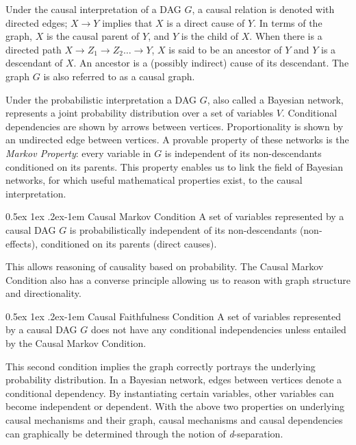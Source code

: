 \documentclass[a4paper, english]{article}
\makeatletter
\renewcommand{\paragraph}{%
  \@startsection{paragraph}{4}%
  {\z@}{0.5ex \@plus 1ex \@minus .2ex}{-1em}%
  {\normalfont\normalsize\bfseries}%
}
\makeatother
\begin{document}
Under the causal interpretation of a DAG $G$, a causal relation is denoted with directed edges; $X \rightarrow Y$ implies that $X$ is a direct cause of $Y$.
In terms of the graph, $X$ is the causal parent of $Y$, and $Y$ is the child of $X$. 
When there is a directed path $X \rightarrow Z_1 \rightarrow Z_2 \dots \rightarrow Y$, $X$ is said to be an ancestor of $Y$ and $Y$ is a descendant of $X$.
An ancestor is a (possibly indirect) cause of its descendant.
The graph $G$ is also referred to as a causal graph.

Under the probabilistic interpretation a DAG $G$, also called a Bayesian network, represents a joint probability distribution over a set of variables $V$.
Conditional dependencies are shown by arrows between vertices.
Proportionality is shown by an undirected edge between vertices.
A provable property of these networks is the \textit{Markov Property}: every variable in $G$ is independent of its non-descendants conditioned on its parents.
This property enables us to link the field of Bayesian networks, for which useful mathematical properties exist, to the causal interpretation.

\paragraph{Causal Markov Condition}
A set of variables represented by a causal DAG $G$ is probabilistically independent of its non-descendants (non-effects), conditioned on its parents (direct causes).

This allows reasoning of causality based on probability.
The Causal Markov Condition also has a converse principle allowing us to reason with graph structure and directionality.

\paragraph{Causal Faithfulness Condition}
A set of variables represented by a causal DAG $G$ does not have any conditional independencies unless entailed by the Causal Markov Condition.

This second condition implies the graph correctly portrays the underlying probability distribution.
In a Bayesian network, edges between vertices denote a conditional dependency.
By instantiating certain variables, other variables can become independent or dependent.
With the above two properties on underlying causal mechanisms and their graph, causal mechanisms and causal dependencies can graphically be determined through the notion of \textit{d}-separation.
\end{document}
